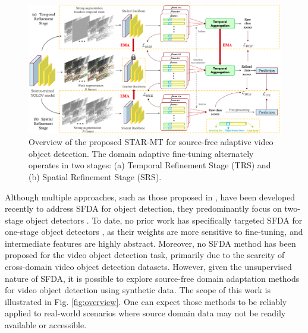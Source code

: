 \begin{figure}
    \centering
    \includegraphics[width = 0.95\linewidth]{figures/SFVOD.png}
    \caption{Overview of the proposed STAR-MT for source-free adaptive video object detection. The domain adaptive fine-tuning alternately operates in two stages: (a) Temporal Refinement Stage (TRS) and (b) Spatial Refinement Stage (SRS).}
    \label{fig:SFVOD}
\end{figure}

Although multiple approaches, such as those proposed in \cite{vibashan2023instance, li2022source, run_and_chase, chen2023exploiting, liu2023periodically, li2021free, cao2023contrastive}, have been developed recently to address SFDA for object detection, they predominantly focus on two-stage object detectors \cite{faster_rcnn}. To date, no prior work has specifically targeted SFDA for one-stage object detectors \cite{YOLOv1}, as their weights are more sensitive to fine-tuning, and intermediate features are highly abstract. Moreover, no SFDA method has been proposed for the video object detection task, primarily due to the scarcity of cross-domain video object detection datasets. However, given the unsupervised nature of SFDA, it is possible to explore source-free domain adaptation methods for video object detection using synthetic data. The scope of this work is illustrated in Fig. \ref{fig:overview}. One can expect those methods to be reliably applied to real-world scenarios where source domain data may not be readily available or accessible.

